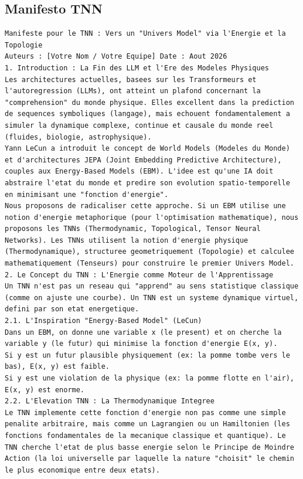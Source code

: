 \documentclass[11pt,a4paper]{article}
\begin{document}
\subsection{Manifesto TNN}
\begin{lstlisting}[language={}, caption={}, basicstyle=\ttfamily\footnotesize, breaklines=true]
Manifeste pour le TNN : Vers un "Univers Model" via l'Energie et la Topologie
Auteurs : [Votre Nom / Votre Equipe] Date : Aout 2026
1. Introduction : La Fin des LLM et l'Ere des Modeles Physiques
Les architectures actuelles, basees sur les Transformeurs et l'autoregression (LLMs), ont atteint un plafond concernant la "comprehension" du monde physique. Elles excellent dans la prediction de sequences symboliques (langage), mais echouent fondamentalement a simuler la dynamique complexe, continue et causale du monde reel (fluides, biologie, astrophysique).
Yann LeCun a introduit le concept de World Models (Modeles du Monde) et d'architectures JEPA (Joint Embedding Predictive Architecture), couples aux Energy-Based Models (EBM). L'idee est qu'une IA doit abstraire l'etat du monde et predire son evolution spatio-temporelle en minimisant une "fonction d'energie".
Nous proposons de radicaliser cette approche. Si un EBM utilise une notion d'energie metaphorique (pour l'optimisation mathematique), nous proposons les TNNs (Thermodynamic, Topological, Tensor Neural Networks). Les TNNs utilisent la notion d'energie physique (Thermodynamique), structuree geometriquement (Topologie) et calculee mathematiquement (Tenseurs) pour construire le premier Univers Model.
2. Le Concept du TNN : L'Energie comme Moteur de l'Apprentissage
Un TNN n'est pas un reseau qui "apprend" au sens statistique classique (comme on ajuste une courbe). Un TNN est un systeme dynamique virtuel, defini par son etat energetique.
2.1. L'Inspiration "Energy-Based Model" (LeCun)
Dans un EBM, on donne une variable x (le present) et on cherche la variable y (le futur) qui minimise la fonction d'energie E(x, y).
Si y est un futur plausible physiquement (ex: la pomme tombe vers le bas), E(x, y) est faible.
Si y est une violation de la physique (ex: la pomme flotte en l'air), E(x, y) est enorme.
2.2. L'Elevation TNN : La Thermodynamique Integree
Le TNN implemente cette fonction d'energie non pas comme une simple penalite arbitraire, mais comme un Lagrangien ou un Hamiltonien (les fonctions fondamentales de la mecanique classique et quantique). Le TNN cherche l'etat de plus basse energie selon le Principe de Moindre Action (la loi universelle par laquelle la nature "choisit" le chemin le plus economique entre deux etats).

\end{lstlisting}
\end{document}
